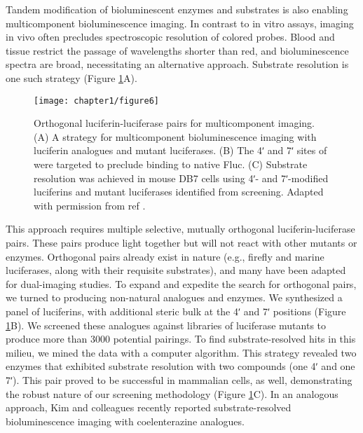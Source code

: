 Tandem modification of bioluminescent enzymes and
substrates is also enabling multicomponent bioluminescence
imaging. In contrast to in vitro assays, imaging in vivo often
precludes spectroscopic resolution of colored probes. Blood
and tissue restrict the passage of wavelengths shorter than red,\cite{Zhao:2005if}
and bioluminescence spectra are broad,\cite{Rumyantsev:2016fd} necessitating an
alternative approach. Substrate resolution is one such strategy
(Figure \ref{fig:jacs_summary}A).

\begin{figure}[htbp]
\texttt{[image: chapter1/figure6]}
\centering
\caption[Orthogonal luciferin-luciferase pairs for multicomponent imaging]{Orthogonal luciferin-luciferase pairs for multicomponent imaging. (A) A strategy for multicomponent bioluminescence imaging with
luciferin analogues and mutant luciferases. (B) The 4ʹ and 7ʹ sites of \dluciferin{} were targeted to preclude binding to native Fluc. (C) Substrate
resolution was achieved in mouse DB7 cells using 4ʹ- and 7ʹ-modified luciferins and mutant luciferases identified from screening. Adapted with
permission from ref \cite{Jones:2017be}.}
  \label{fig:jacs_summary}
\end{figure}

This approach requires multiple selective,
mutually orthogonal luciferin-luciferase pairs. These pairs
produce light together but will not react with other mutants or
enzymes. Orthogonal pairs already exist in nature (e.g., firefly
and marine luciferases, along with their requisite substrates),
and many have been adapted for dual-imaging studies.
To expand and expedite the search for orthogonal pairs, we
turned to producing non-natural analogues and enzymes.\cite{Jones:2017be} We
synthesized a panel of luciferins, with additional steric bulk at
the 4ʹ and 7ʹ positions (Figure \ref{fig:jacs_summary}B). We screened these
analogues against libraries of luciferase mutants to produce
more than 3000 potential pairings. To find substrate-resolved
hits in this milieu, we mined the data with a computer
algorithm. This strategy revealed two enzymes that exhibited
substrate resolution with two compounds (one 4ʹ and one 7ʹ).
This pair proved to be successful in mammalian cells, as well,
demonstrating the robust nature of our screening methodology
(Figure \ref{fig:jacs_summary}C). In an analogous approach, Kim and colleagues
recently reported substrate-resolved bioluminescence imaging
with coelenterazine analogues.\cite{Nishihara:2017bd}
